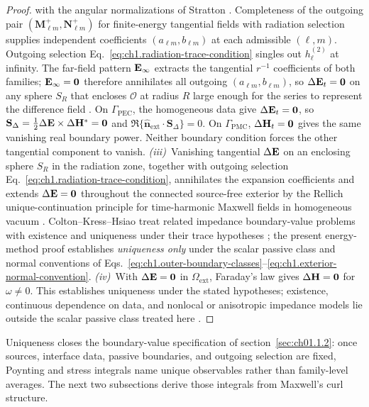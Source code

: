 \begin{proof}
with the angular normalizations of Stratton \cite[\S7.11]{stratton1941,harrington2001}. Completeness of the outgoing pair $(\mathbf M_{\ell m}^{+},\mathbf N_{\ell m}^{+})$ for finite-energy tangential fields with radiation selection supplies independent coefficients $(a_{\ell m},b_{\ell m})$ at each admissible $(\ell,m)$. Outgoing selection Eq.~\eqref{eq:ch1.radiation-trace-condition} singles out $h_\ell^{(2)}$ at infinity. The far-field pattern $\mathbf{E}_\infty$ extracts the tangential $r^{-1}$ coefficients of both families; $\mathbf{E}_\infty=\mathbf{0}$ therefore annihilates all outgoing $(a_{\ell m},b_{\ell m})$, so $\Delta\mathbf{E}_t=\mathbf{0}$ on any sphere $S_R$ that encloses $\mathcal{O}$ at radius $R$ large enough for the series to represent the difference field \cite{stratton1941,harrington2001}. On $\Gamma_{\mathrm{PEC}}$, the homogeneous data give $\Delta\mathbf{E}_t=\mathbf{0}$, so $\mathbf{S}_\Delta=\tfrac12\Delta\mathbf{E}\times\Delta\mathbf{H}^*=\mathbf{0}$ and $\Re\{\hat{\mathbf{n}}_{\mathrm{ext}}\cdot\mathbf{S}_\Delta\}=0$. On $\Gamma_{\mathrm{PMC}}$, $\Delta\mathbf{H}_t=\mathbf{0}$ gives the same vanishing real boundary power. Neither boundary condition forces the other tangential component to vanish. \emph{(iii)}~Vanishing tangential $\Delta\mathbf{E}$ on an enclosing sphere $S_R$ in the radiation zone, together with outgoing selection Eq.~\eqref{eq:ch1.radiation-trace-condition}, annihilates the expansion coefficients and extends $\Delta\mathbf{E}=\mathbf{0}$ throughout the connected source-free exterior by the Rellich unique-continuation principle for time-harmonic Maxwell fields in homogeneous vacuum \cite{sommerfeld1949,harrington2001}. Colton--Kress--Hsiao treat related impedance boundary-value problems with existence and uniqueness under their trace hypotheses \cite{colton1981impedance}; the present energy-method proof establishes \emph{uniqueness only} under the scalar passive class and normal conventions of Eqs.~\eqref{eq:ch1.outer-boundary-classes}--\eqref{eq:ch1.exterior-normal-convention}. \emph{(iv)}~With $\Delta\mathbf{E}=\mathbf{0}$ in $\Omega_{\mathrm{ext}}$, Faraday's law gives $\Delta\mathbf{H}=\mathbf{0}$ for $\omega\neq0$. This establishes uniqueness under the stated hypotheses; existence, continuous dependence on data, and nonlocal or anisotropic impedance models lie outside the scalar passive class treated here \cite{stratton1941,colton1981impedance}.
\end{proof}
\label{prop:ch1.uniqueness-passive-closure}
\label{eq:ch1.uniqueness-condition-index}

Uniqueness closes the boundary-value specification of section~\ref{sec:ch01.1.2}: once sources, interface data, passive boundaries, and outgoing selection are fixed, Poynting and stress integrals name unique observables rather than family-level averages. The next two subsections derive those integrals from Maxwell's curl structure.

